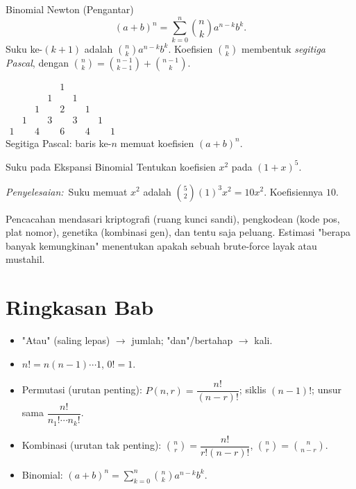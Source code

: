 \documentclass[11pt,a4paper]{report}
\theoremstyle{gaya}
\newcommand{\jawab}{\par\smallskip\noindent\textit{\textcolor{oranye}{Penyelesaian:}}\ }
\begin{document}
\begin{konsep}{Binomial Newton (Pengantar)}
\[
(a+b)^n=\sum_{k=0}^{n}\binom{n}{k}a^{n-k}b^{k}.
\]
Suku ke-$(k+1)$ adalah $\binom{n}{k}a^{n-k}b^{k}$. Koefisien $\binom nk$ membentuk \emph{segitiga Pascal}, dengan $\binom nk=\binom{n-1}{k-1}+\binom{n-1}{k}$.
\end{konsep}

\begin{center}
\small
$\begin{array}{ccccccccc}
 & & & & 1 & & & &\\
 & & & 1 & & 1 & & &\\
 & & 1 & & 2 & & 1 & &\\
 & 1 & & 3 & & 3 & & 1 &\\
1 & & 4 & & 6 & & 4 & & 1
\end{array}$\\
\small Segitiga Pascal: baris ke-$n$ memuat koefisien $(a+b)^n$.
\end{center}

\begin{contoh}{Suku pada Ekspansi Binomial}
Tentukan koefisien $x^2$ pada $(1+x)^5$.

\jawab Suku memuat $x^2$ adalah $\binom{5}{2}(1)^{3}x^{2}=10x^2$. Koefisiennya $10$.
\end{contoh}

\begin{dunianyata}
Pencacahan mendasari kriptografi (ruang kunci sandi), pengkodean (kode pos, plat nomor), genetika (kombinasi gen), dan tentu saja peluang. Estimasi "berapa banyak kemungkinan" menentukan apakah sebuah brute-force layak atau mustahil.
\end{dunianyata}

\section*{Ringkasan Bab}
\begin{itemize}[leftmargin=*,topsep=2pt]
  \item "Atau" (saling lepas) $\to$ jumlah; "dan"/bertahap $\to$ kali.
  \item $n!=n(n-1)\cdots1$, $0!=1$.
  \item Permutasi (urutan penting): $P(n,r)=\dfrac{n!}{(n-r)!}$; siklis $(n-1)!$; unsur sama $\dfrac{n!}{n_1!\cdots n_k!}$.
  \item Kombinasi (urutan tak penting): $\binom nr=\dfrac{n!}{r!(n-r)!}$, $\binom nr=\binom{n}{n-r}$.
  \item Binomial: $(a+b)^n=\sum_{k=0}^n\binom nk a^{n-k}b^k$.
\end{itemize}
\end{document}
